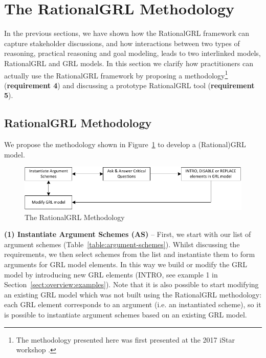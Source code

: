 \section{The RationalGRL Methodology}
\label{sect:methodology}

In the previous sections, we have shown how the RationalGRL framework can capture stakeholder discussions, and how interactions between two types of reasoning, practical reasoning and goal modeling, leads to two interlinked models, RationalGRL and GRL models. In this section we clarify how practitioners can actually use the RationalGRL framework by proposing a methodology\footnote{The methodology presented here was first presented at the 2017 iStar workshop \cite{iSTar}.} (\textbf{requirement 4}) and discussing a prototype RationalGRL tool (\textbf{requirement 5}).

\subsection{RationalGRL Methodology}
\label{sect:methodology} 

We propose the methodology shown in Figure~\ref{fig:rationalgrl-methodology} to develop a (Rational)GRL model. %

\begin{figure}[ht]
\centering
\includegraphics{img/methodology.pdf}
\caption{The RationalGRL Methodology}
\label{fig:rationalgrl-methodology}
\end{figure}

\textbf{(1) Instantiate Argument Schemes (AS)} -- First, we start with our list of argument schemes (Table~\ref{table:argument-schemes}). Whilst discussing the requirements, we then select schemes from the list and instantiate them to form arguments for GRL model elements. In this way we build or modify the GRL model by introducing new GRL elements (\textsf{INTRO}, see example 1 in Section~\ref{sect:overview:examples}). Note that it is also possible to start modifying an existing GRL model which was not built using the RationalGRL methodology: each GRL element corresponds to an argument (i.e. an instantiated scheme), so it is possible to instantiate argument schemes based on an existing GRL model. 

